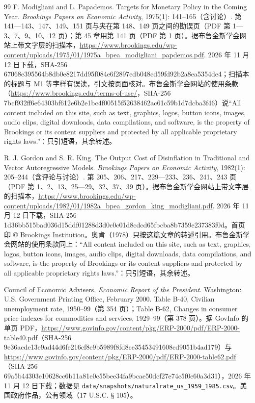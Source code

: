 \begin{thebibliography}{99}
 F. Modigliani and L. Papademos. Targets for Monetary Policy in the Coming Year. \emph{Brookings Papers on Economic Activity}, 1975(1): 141--165（含讨论）. 第 141—143、147、149、151 页与夹在第 148、149 页之间的勘误页（PDF 第 1—3、7、9、10、12 页）；第 45 章用第 141 页（PDF 第 1 页）。据布鲁金斯学会网站上带文字层的扫描本，\url{https://www.brookings.edu/wp-content/uploads/1975/01/1975a_bpea_modigliani_papdemos.pdf}. 2026 年 11 月 12 日下载，SHA-256 67068e395564b8db0e8217dd95f084e6f2897edb048cd59fd92b2a8ea5354de4；扫描本的标题与 M1 等字样有误读，引文按页面核对。布鲁金斯学会网站的使用条款（\url{https://www.brookings.edu/terms-of-use/}，SHA-256 7bcf932ff6e64303bf612e6b2e1bc4f00515f52638462ac61c59b1d7dcba3f46）说“All content included on this site, such as text, graphics, logos, button icons, images, audio clips, digital downloads, data compilations, and software, is the property of Brookings or its content suppliers and protected by all applicable proprietary rights laws.”：只引短语，其余转述。

 R. J. Gordon and S. R. King. The Output Cost of Disinflation in Traditional and Vector Autoregressive Models. \emph{Brookings Papers on Economic Activity}, 1982(1): 205--244（含评论与讨论）. 第 205、206、217、229—233、236、241、243 页（PDF 第 1、2、13、25—29、32、37、39 页）。据布鲁金斯学会网站上带文字层的扫描本，\url{https://www.brookings.edu/wp-content/uploads/1982/01/1982a_bpea_gordon_king_modigliani.pdf}. 2026 年 11 月 12 日下载，SHA-256 1d36bb515bad036d15ddf01288d3d0c0c01d8cdcd65fbcba8b7359e237383f0d。首页印 © Brookings Institution。奥肯（1978）只按这篇文章的转述引用。布鲁金斯学会网站的使用条款同上：“All content included on this site, such as text, graphics, logos, button icons, images, audio clips, digital downloads, data compilations, and software, is the property of Brookings or its content suppliers and protected by all applicable proprietary rights laws.”：只引短语，其余转述。

 Council of Economic Advisers. \emph{Economic Report of the President}. Washington: U.S. Government Printing Office, February 2000. Table B-40, Civilian unemployment rate, 1950--99（第 354 页）；Table B-62, Changes in consumer price indexes for commodities and services, 1929--99（第 378 页）。据 GovInfo 的单页 PDF，\url{https://www.govinfo.gov/content/pkg/ERP-2000/pdf/ERP-2000-table40.pdf}（SHA-256 9e36acde13e9ad44d6fe216cf8e9b5989f8fd8ce35453491608cd9051b4ad179）与 \url{https://www.govinfo.gov/content/pkg/ERP-2000/pdf/ERP-2000-table62.pdf}（SHA-256 69a5b44303e10628cc6b11a81e0c55bee34fa9bcae50dcf27e74c5f0e60a3d31），2026 年 11 月 12 日下载；数据见 \texttt{data/snapshots/naturalrate\_us\_1959\_1985.csv}。美国政府作品，公有领域（17 U.S.C. § 105）。


\end{thebibliography}
